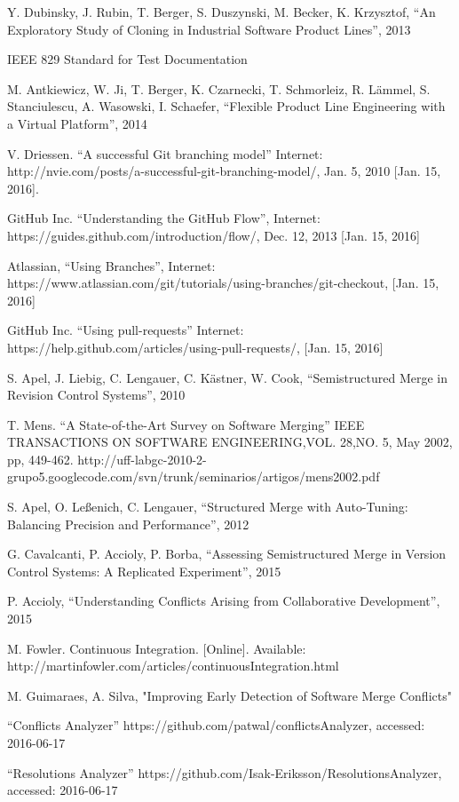 \begin{thebibliography}{69}
 Y. Dubinsky, J. Rubin, T. Berger, S. Duszynski, M. Becker, K. Krzysztof, “An Exploratory Study of Cloning in Industrial Software Product Lines”, 2013

 IEEE 829 Standard for Test Documentation

 M. Antkiewicz, W. Ji, T. Berger, K. Czarnecki, T. Schmorleiz, R. Lämmel, S. Stanciulescu, A. Wasowski, I. Schaefer, “Flexible Product Line Engineering with a Virtual Platform”, 2014

 V. Driessen. “A successful Git branching model” Internet: http://nvie.com/posts/a-successful-git-branching-model/, Jan. 5, 2010 [Jan. 15, 2016].

 GitHub Inc. “Understanding the GitHub Flow”, Internet: https://guides.github.com/introduction/flow/, Dec. 12, 2013 [Jan. 15, 2016]

 Atlassian, “Using Branches”, Internet: https://www.atlassian.com/git/tutorials/using-branches/git-checkout, [Jan. 15, 2016]

 GitHub Inc. “Using pull-requests” Internet: https://help.github.com/articles/using-pull-requests/, [Jan. 15, 2016]

 S. Apel, J. Liebig, C. Lengauer, C. Kästner, W. Cook, “Semistructured Merge in Revision Control Systems”, 2010

 T. Mens. “A State-of-the-Art Survey on Software Merging” IEEE TRANSACTIONS ON SOFTWARE ENGINEERING,VOL. 28,NO. 5, May 2002, pp, 449-462.
http://uff-labgc-2010-2-grupo5.googlecode.com/svn/trunk/seminarios/artigos/mens2002.pdf

 S. Apel, O. Leßenich, C. Lengauer, “Structured Merge with Auto-Tuning: Balancing Precision and Performance”, 2012

 G. Cavalcanti, P. Accioly, P. Borba, “Assessing Semistructured Merge in Version Control Systems: A Replicated Experiment”, 2015

 P. Accioly, “Understanding Conflicts Arising from Collaborative Development”, 2015

 M. Fowler. Continuous Integration. [Online]. Available:
http://martinfowler.com/articles/continuousIntegration.html

 M. Guimaraes, A. Silva, "Improving Early Detection of Software Merge Conflicts"

 “Conflicts Analyzer” https://github.com/patwal/conflictsAnalyzer, accessed: 2016-06-17

 “Resolutions Analyzer” https://github.com/Isak-Eriksson/ResolutionsAnalyzer, accessed: 2016-06-17

\end{thebibliography}
